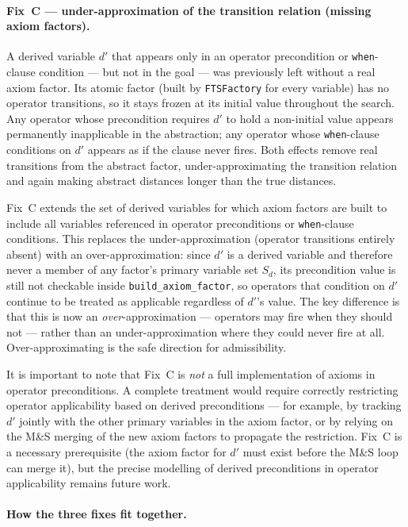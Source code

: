 \documentclass[11pt,a4paper]{article}
\begin{document}
\paragraph{Fix~C --- under-approximation of the transition relation (missing
axiom factors).}

A derived variable $d'$ that appears only in an operator precondition or
\texttt{when}-clause condition --- but not in the goal --- was previously
left without a real axiom factor.  Its atomic factor (built by
\texttt{FTSFactory} for every variable) has no operator transitions, so
it stays frozen at its initial value throughout the search.  Any operator
whose precondition requires $d'$ to hold a non-initial value appears
permanently inapplicable in the abstraction; any operator whose
\texttt{when}-clause conditions on $d'$ appears as if the clause never
fires.  Both effects remove real transitions from the abstract factor,
under-approximating the transition relation and again making abstract
distances longer than the true distances.

Fix~C extends the set of derived variables for which axiom factors are
built to include all variables referenced in operator preconditions or
\texttt{when}-clause conditions.  This replaces the under-approximation
(operator transitions entirely absent) with an over-approximation:
since $d'$ is a derived variable and therefore never a member of any
factor's primary variable set $S_d$, its precondition value is still
not checkable inside \texttt{build\_axiom\_factor}, so operators that
condition on $d'$ continue to be treated as applicable regardless of
$d'$'s value.  The key difference is that this is now an
\emph{over}-approximation --- operators may fire when they should not ---
rather than an under-approximation where they could never fire at all.
Over-approximating is the safe direction for admissibility.

It is important to note that Fix~C is \emph{not} a full implementation
of axioms in operator preconditions.  A complete treatment would require
correctly restricting operator applicability based on derived preconditions
--- for example, by tracking $d'$ jointly with the other primary variables
in the axiom factor, or by relying on the M\&S merging of the new axiom
factors to propagate the restriction.  Fix~C is a necessary prerequisite
(the axiom factor for $d'$ must exist before the M\&S loop can merge it),
but the precise modelling of derived preconditions in operator applicability
remains future work.

\paragraph{How the three fixes fit together.}
\end{document}
